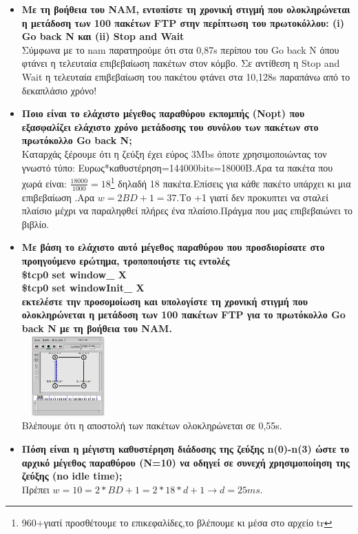 \documentclass{article}
\begin{document}
\begin{itemize}
	\item \textbf{Με τη βοήθεια του NAM, εντοπίστε τη χρονική στιγμή που ολοκληρώνεται η μετάδοση των 100
		πακέτων FTP στην περίπτωση του πρωτοκόλλου: (i) Go back N και (ii) Stop and Wait}\\
	Σύμφωνα με το nam παρατηρούμε ότι στα 0,87s περίπου του Go back N όπου φτάνει η τελευταία επιβεβαίωση πακέτων στον κόμβο. Σε αντίθεση η Stop and Wait η τελευταία επιβεβαίωση του πακέτου φτάνει στα 10,128s παραπάνω από το δεκαπλάσιο χρόνο!
	\item \textbf{Ποιο είναι το ελάχιστο μέγεθος παραθύρου εκπομπής (Nopt) που εξασφαλίζει ελάχιστο χρόνο
		μετάδοσης του συνόλου των πακέτων στο πρωτόκολλο Go back N;}\\
	Καταρχάς ξέρουμε ότι η ζεύξη έχει εύρος 3Mbs όποτε χρησιμοποιώντας τον γνωστό τύπο: Ευρως*καθυστέρηση=144000bits=18000B.Άρα τα πακέτα που χωρά είναι: $\frac{18000}{1000}=18$\footnote{960+γιατί προσθέτουμε το επικεφαλίδες,το βλέπουμε κι μέσα στο αρχείο tr} δηλαδή 18 πακέτα.Επίσεις για κάθε πακέτο υπάρχει κι μια επιβεβαίωση .Αρα $w=2BD+1=37$.Το +1 γιατί δεν προκυπτει να σταλεί πλαίσιο μέχρι να παραληφθεί πλήρες ένα πλαίσιο.Πράγμα που μας επιβεβαιώνει το βιβλίο.
	\item \textbf{Με βάση το ελάχιστο αυτό μέγεθος παραθύρου που προσδιορίσατε στο προηγούμενο ερώτημα,
		τροποποιήστε τις εντολές\\
		\$tcp0 set window\_ X \\
		\$tcp0 set windowInit\_ X\\
		εκτελέστε την προσομοίωση και υπολογίστε τη χρονική στιγμή που ολοκληρώνεται η μετάδοση
		των 100 πακέτων FTP για το πρωτόκολλο Go back N με τη βοήθεια του NAM.}\\
	\includegraphics[width=100pt,height=88pt]{nam2} \\
	Βλέπουμε ότι η αποστολή των πακέτων ολοκληρώνεται σε 0,55s. 
	\item \textbf{Πόση είναι η μέγιστη καθυστέρηση διάδοσης της ζεύξης n(0)-n(3) ώστε το αρχικό μέγεθος
				παραθύρου (Ν=10) να οδηγεί σε συνεχή χρησιμοποίηση της ζεύξης (no idle time);}\\ Πρέπει $w=10=2*BD+1=2*18*d+1 \rightarrow d=25ms$. \\

\end{itemize}
\end{document}
